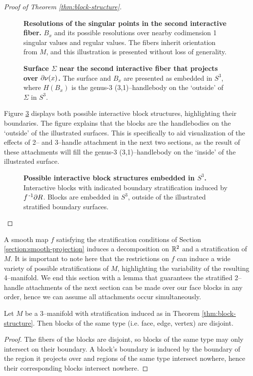 \begin{proof}[Proof of Theorem \ref{thm:block-structure}]
	\begin{figure}[h!]
		\caption{
			\textbf{Resolutions of the singular points in the second interactive fiber.}
			$B_x$ and its possible resolutions over nearby codimension 1 singular values and regular values.
			The fibers inherit orientation from $M$, and this illustration is presented without loss of generality.
		}
		\label{fig:codim-2-interactive-fiber-2}
	\end{figure}

	\begin{figure}[h!]
		\caption{
			\textbf{Surface $\Sigma$ near the second interactive fiber that projects over $\partial\nu(x)$.}
			The surface and $B_x$ are presented as embedded in $S^3$, where $H(B_x)$ is the genus-3 (3,1)--handlebody on the `outside' of $\Sigma$ in $S^3$.
		}
		\label{fig:codim-2-surface-2}
	\end{figure}

	Figure \ref{fig:codim-2-blocks} displays both possible interactive block structures, highlighting their boundaries.
	The figure explains that the blocks are the handlebodies on the `outside' of the illustrated surfaces.
	This is specifically to aid visualization of the effects of 2-- and 3--handle attachment in the next two sections, as the result of these attachments will fill the genus-3 (3,1)--handlebody on the `inside' of the illustrated surface.

	\begin{figure}[h!]
	\caption{
		\textbf{Possible interactive block structures embedded in $S^3$.}
		Interactive blocks with indicated boundary stratification induced by $f^{\,\text{-}1} \partial R$.
		Blocks are embedded in $S^3$, outside of the illustrated stratified boundary surfaces.
	}
	\label{fig:codim-2-blocks}
	\end{figure}
\end{proof}

A smooth map $f$ satisfying the stratification conditions of Section \ref{section:smooth-projection} induces a decomposition on $\mathbb{R}^2$ and a stratification of $M$.
It is important to note here that the restrictions on $f$ can induce a wide variety of possible stratifications of $M$, highlighting the variability of the resulting 4--manifold.
We end this section with a lemma that guarantees the stratified 2--handle attachments of the next section can be made over our face blocks in any order, hence we can assume all attachments occur simultaneously.


\begin{lem}
	Let $M$ be a 3--manifold with stratification induced as in Theorem \ref{thm:block-structure}.
	Then blocks of the same type (i.e. face, edge, vertex) are disjoint.
\end{lem}

\begin{proof}
	The fibers of the blocks are disjoint, so blocks of the same type may only intersect on their boundary.
	A block's boundary is induced by the boundary of the region it projects over and regions of the same type intersect nowhere, hence their corresponding blocks intersect nowhere.	
\end{proof}


